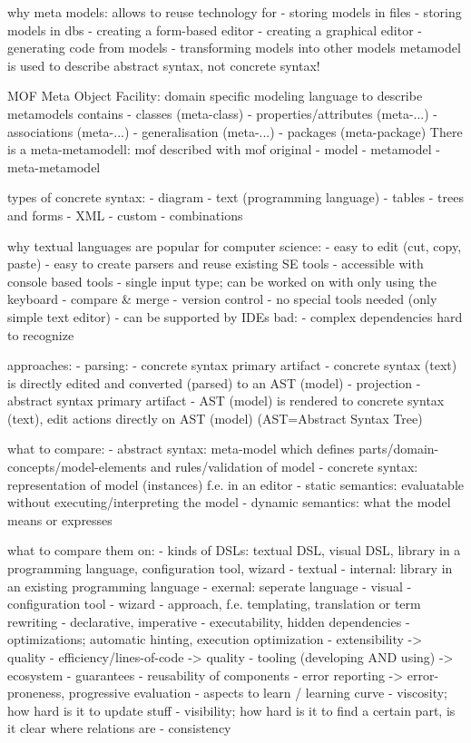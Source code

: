 why meta models: allows to reuse technology for
- storing models in files
- storing models in dbs
- creating a form-based editor
- creating a graphical editor
- generating code from models
- transforming models into other models
metamodel is used to describe abstract syntax, not concrete syntax!

MOF Meta Object Facility: domain specific modeling language to describe metamodels
contains
- classes (meta-class)
- properties/attributes (meta-...)
- associations (meta-...)
- generalisation (meta-...)
- packages (meta-package)
There is a meta-metamodell: mof described with mof
original - model - metamodel - meta-metamodel

types of concrete syntax:
- diagram
- text (programming language)
- tables
- trees and forms
- XML
- custom
- combinations

why textual languages are popular for computer science:
- easy to edit (cut, copy, paste)
- easy to create parsers and reuse existing SE tools
- accessible with console based tools
- single input type; can be worked on with only using the keyboard
- compare & merge
- version control
- no special tools needed (only simple text editor)
- can be supported by IDEs
bad:
- complex dependencies hard to recognize

approaches:
- parsing:
  - concrete syntax primary artifact
  - concrete syntax (text) is directly edited and converted (parsed) to an AST (model)
- projection
  - abstract syntax primary artifact
  - AST (model) is rendered to concrete syntax (text), edit actions directly on AST (model) (AST=Abstract Syntax Tree)

what to compare:
- abstract syntax: meta-model which defines parts/domain-concepts/model-elements and rules/validation of model
- concrete syntax: representation of model (instances) f.e. in an editor
- static semantics: evaluatable without executing/interpreting the model
- dynamic semantics: what the model means or expresses

what to compare them on:
- kinds of DSLs: textual DSL, visual DSL, library in a programming language, configuration tool, wizard
  - textual
    - internal: library in an existing programming language
    - exernal: seperate language
  - visual
    - configuration tool
    - wizard
- approach, f.e. templating, translation or term rewriting
  - declarative, imperative
- executability, hidden dependencies
- optimizations; automatic hinting, execution optimization
- extensibility -> quality
- efficiency/lines-of-code -> quality
- tooling (developing AND using) -> ecosystem
- guarantees
- reusability of components
- error reporting -> error-proneness, progressive evaluation
- aspects to learn / learning curve
- viscosity; how hard is it to update stuff
- visibility; how hard is it to find a certain part, is it clear where relations are
- consistency


